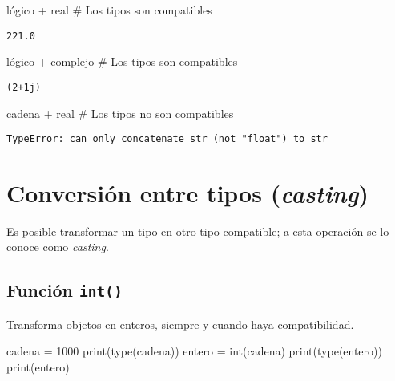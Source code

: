 \documentclass[
  letterpaper,
  DIV=11,
  numbers=noendperiod]{scrreprt}
\newenvironment{Shaded}{\begin{snugshade}}{\end{snugshade}}
\newcommand{\BuiltInTok}[1]{\textcolor[rgb]{0.00,0.23,0.31}{#1}}
\newcommand{\CommentTok}[1]{\textcolor[rgb]{0.37,0.37,0.37}{#1}}
\newcommand{\NormalTok}[1]{\textcolor[rgb]{0.00,0.23,0.31}{#1}}
\newcommand{\OperatorTok}[1]{\textcolor[rgb]{0.37,0.37,0.37}{#1}}
\newcommand{\StringTok}[1]{\textcolor[rgb]{0.13,0.47,0.30}{#1}}
\begin{document}
\begin{Shaded}
\begin{Highlighting}[]
\NormalTok{lógico }\OperatorTok{+}\NormalTok{ real }\CommentTok{\# Los tipos son compatibles}
\end{Highlighting}
\end{Shaded}

\begin{verbatim}
221.0
\end{verbatim}

\begin{Shaded}
\begin{Highlighting}[]
\NormalTok{lógico }\OperatorTok{+}\NormalTok{ complejo }\CommentTok{\# Los tipos son compatibles}
\end{Highlighting}
\end{Shaded}

\begin{verbatim}
(2+1j)
\end{verbatim}

\begin{Shaded}
\begin{Highlighting}[]
\NormalTok{cadena }\OperatorTok{+}\NormalTok{ real  }\CommentTok{\# Los tipos no son compatibles}
\end{Highlighting}
\end{Shaded}

\begin{verbatim}
TypeError: can only concatenate str (not "float") to str
\end{verbatim}

\section{\texorpdfstring{Conversión entre tipos
(\emph{casting})}{Conversión entre tipos (casting)}}\label{conversiuxf3n-entre-tipos-casting}

Es posible transformar un tipo en otro tipo compatible; a esta operación
se lo conoce como \emph{casting}.

\subsection{\texorpdfstring{Función
\texttt{int()}}{Función int()}}\label{funciuxf3n-int}

Transforma objetos en enteros, siempre y cuando haya compatibilidad.

\begin{Shaded}
\begin{Highlighting}[]
\NormalTok{cadena }\OperatorTok{=} \StringTok{\textquotesingle{}1000\textquotesingle{}}
\BuiltInTok{print}\NormalTok{(}\BuiltInTok{type}\NormalTok{(cadena))}
\NormalTok{entero }\OperatorTok{=} \BuiltInTok{int}\NormalTok{(cadena)}
\BuiltInTok{print}\NormalTok{(}\BuiltInTok{type}\NormalTok{(entero))}
\BuiltInTok{print}\NormalTok{(entero)}
\end{Highlighting}
\end{Shaded}
\end{document}
